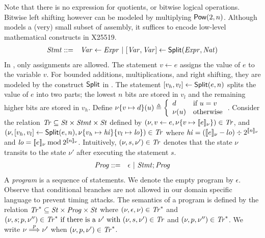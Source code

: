 Note that there is no expression for quotients, or bitwise logical
operations. Bitwise left shifting however can be modeled by
multiplying $\mbox{\textsf{Pow}}(2, n)$. Although \mydsl models a (very) 
small subset of assembly, it suffices to encode low-level
mathematical constructs in X25519.
\begin{eqnarray*}
  \mathit{Stmt} & ::= & \mathit{Var} \leftarrow \mathit{Expr}
            \ |\  {[}{\mathit{Var}}, {\mathit{Var}}{]} \leftarrow \mbox{\textsf{Split}} (\mathit{Expr}, \mathit{Nat})
\end{eqnarray*}
In \mydsl, only assignments are allowed.
The statement $v \leftarrow e$ assigns the value of $e$
to the variable $v$. For bounded additions, multiplications, and right
shifting, they are modeled by the construct $\mbox{\textsf{Split}}$ in \mydsl.
The statement ${[}{v_h}, {v_l}{]} \leftarrow
\mbox{\textsf{Split}}(e, n)$ splits the value of $e$ into two parts;
the lowest $n$ bits are stored in $v_l$ and the remaining higher bits
are stored in $v_h$. Define
$
\nu\{{v} \mapsto {d}\}(u) \triangleq
\left\{
   \begin{array}{ll}
     d & \textmd{if $u = v$}\\
     \nu(u) & \textmd{otherwise}
   \end{array}
\right.
$.
Consider the relation $\mathit{Tr} \subseteq \mathit{St} \times \mathit{Stmt} \times \mathit{St}$ defined
by $(\nu, v \leftarrow e, \nu\{{v} \mapsto {[\![{e}]\!]_{\nu}}\}) \in \mathit{Tr}$, and
  $(\nu, {[}{v_h}, {v_l}{]} \leftarrow \mbox{\textsf{Split}} (e, n), 
  \nu\{{v_h} \mapsto {\mathit{hi}}\}\{{v_l} \mapsto {\mathit{lo}}\}) \in \mathit{Tr}$
where
$\mathit{hi} = ([\![{e}]\!]_{\nu} - lo) \div 2^{[\![{n}]\!]_{\nu}}$ and
$\mathit{lo} = [\![{e}]\!]_{\nu} \mathbin{\textmd{mod}} 2^{[\![{n}]\!]_{\nu}}$.
Intuitively, $(\nu, s, \nu') \in \mathit{Tr}$ denotes that the state $\nu$ transits to 
the state $\nu'$ after executing the statement $s$.
\begin{eqnarray*}
  \mathit{Prog} & ::= & \epsilon \ |\ \mathit{Stmt}; \mathit{Prog}
\end{eqnarray*}
A \emph{program} is a sequence of statements. We denote the empty program by 
$\epsilon$. Observe that conditional branches are not allowed in our
domain specific language to prevent timing attacks. The semantics of a
program is defined by the relation 
$\mathit{Tr}^* \subseteq \mathit{St} \times \mathit{Prog} \times \mathit{St}$ where
$(\nu, \epsilon, \nu) \in \mathit{Tr}^*$ and
$(\nu, s; p, \nu'') \in \mathit{Tr}^* \textmd{ if }
    \textmd{there is a } \nu' \textmd{ with }
    (\nu, s, \nu') \in \mathit{Tr}$ and
    $(\nu, p, \nu'') \in \mathit{Tr}^*$.
We write $\nu \overset{p}{\Longrightarrow} \nu'$ when $(\nu, p, \nu') \in \mathit{Tr}^*$.

